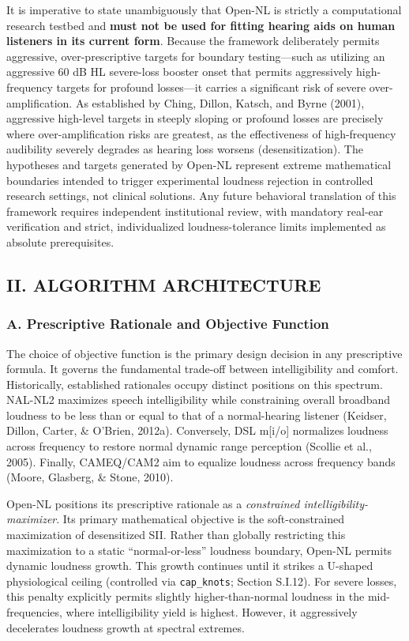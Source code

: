 \documentclass[
  12pt,
]{article}
\begin{document}
It is imperative to state unambiguously that Open-NL is strictly a
computational research testbed and \textbf{must not be used for fitting
hearing aids on human listeners in its current form}. Because the
framework deliberately permits aggressive, over-prescriptive targets for
boundary testing---such as utilizing an aggressive 60 dB HL severe-loss
booster onset that permits aggressively high-frequency targets for
profound losses---it carries a significant risk of severe
over-amplification. As established by Ching, Dillon, Katsch, and Byrne
(2001), aggressive high-level targets in steeply sloping or profound
losses are precisely where over-amplification risks are greatest, as the
effectiveness of high-frequency audibility severely degrades as hearing
loss worsens (desensitization). The hypotheses and targets generated by
Open-NL represent extreme mathematical boundaries intended to trigger
experimental loudness rejection in controlled research settings, not
clinical solutions. Any future behavioral translation of this framework
requires independent institutional review, with mandatory real-ear
verification and strict, individualized loudness-tolerance limits
implemented as absolute prerequisites.

\subsection{II. ALGORITHM
ARCHITECTURE}\label{ii.-algorithm-architecture}

\subsubsection{A. Prescriptive Rationale and Objective
Function}\label{a.-prescriptive-rationale-and-objective-function}

The choice of objective function is the primary design decision in any
prescriptive formula. It governs the fundamental trade-off between
intelligibility and comfort. Historically, established rationales occupy
distinct positions on this spectrum. NAL-NL2 maximizes speech
intelligibility while constraining overall broadband loudness to be less
than or equal to that of a normal-hearing listener (Keidser, Dillon,
Carter, \& O'Brien, 2012a). Conversely, DSL m{[}i/o{]} normalizes
loudness across frequency to restore normal dynamic range perception
(Scollie et al., 2005). Finally, CAMEQ/CAM2 aim to equalize loudness
across frequency bands (Moore, Glasberg, \& Stone, 2010).

Open-NL positions its prescriptive rationale as a \emph{constrained
intelligibility-maximizer}. Its primary mathematical objective is the
soft-constrained maximization of desensitized SII. Rather than globally
restricting this maximization to a static ``normal-or-less'' loudness
boundary, Open-NL permits dynamic loudness growth. This growth continues
until it strikes a U-shaped physiological ceiling (controlled via
\texttt{cap\_knots}; Section S.I.12). For severe losses, this penalty
explicitly permits slightly higher-than-normal loudness in the
mid-frequencies, where intelligibility yield is highest. However, it
aggressively decelerates loudness growth at spectral extremes.
\end{document}
